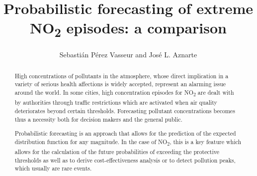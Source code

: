 \documentclass[a4paper,3p,sort&compress]{elsarticle}
\begin{document}
\linenumbers

\newcommand{\no}{NO\textsubscript{2}\xspace}

\begin{frontmatter}

  \title{Probabilistic forecasting of extreme \no episodes: a comparison}


\author{Sebasti\'an P\'erez Vasseur and Jos\'e L. Aznarte}
\address{Artificial Intelligence Department\\Universidad Nacional de
  Educaci\'on a Distancia --- UNED\\c/ Juan del Rosal, 16, Madrid, Spain}


\begin{abstract}

  High concentrations of pollutants in the atmosphere, whose direct
  implication in a variety of serious health affections is widely
  accepted, represent an alarming issue around the world. In some
  cities, high concentration episodes for \no are dealt with by
  authorities through traffic restrictions which are activated when
  air quality deteriorates beyond certain thresholds. Forecasting
  pollutant concentrations becomes thus a necessity both for decision
  makers and the general public.

  Probabilistic forecasting is an approach that %
  allows for the prediction of the expected distribution function for
  any magnitude. In the case of \no, this is a key feature which
  allows for the calculation of the future probabilities of exceeding
  the protective thresholds as well as to derive cost-effectiveness
  analysis or to %
  detect pollution peaks, which usually are rare events.


\end{abstract}
\end{frontmatter}
\end{document}
